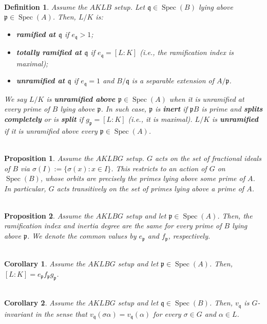 \documentclass[11pt]{article}
\newcommand{\mf}[1]{\mathfrak{#1}}
\DeclareMathOperator{\Spec}{Spec}
\newtheorem*{corollary*}{\\Corollary}
\newtheorem*{definition*}{\\Definition}
\newtheorem*{proposition*}{\\Proposition}
\begin{document}
\begin{definition*}
Assume the $AKLB$ setup. Let $\mf{q}\in\Spec(B)$ lying above $\mf{p}\in\Spec(A)$. Then, $L/K$ is:
\begin{itemize}
\item \textbf{ramified at $\mf{q}$} if $e_{\mf{q}}>1$;
\item \textbf{totally ramified at $\mf{q}$} if $e_{\mf{q}}=[L:K]$ (i.e., the ramification index is maximal);
\item \textbf{unramified at $\mf{q}$} if $e_{\mf{q}}=1$ \emph{and} $B/\mf{q}$ is a separable extension of $A/\mf{p}$.
\end{itemize}
We say $L/K$ is \textbf{unramified above $\mf{p}\in\Spec(A)$} when it is unramified at every prime of $B$ lying above $\mf{p}$. In such case, $\mf{p}$ is \textbf{inert} if $\mf{p}B$ is prime and \textbf{splits completely} or is \textbf{split} if $g_{\mf{p}}=[L:K]$ (i.e., it is maximal). $L/K$ is \textbf{unramified} if it is unramified above every $\mf{p}\in\Spec(A)$.
\end{definition*}

\begin{proposition*}
Assume the $AKLBG$ setup. $G$ acts on the set of fractional ideals of $B$ via $\sigma(I):=\{\sigma(x) : x\in I\}$. This restricts to an action of $G$ on $\Spec(B)$, whose orbits are precisely the primes lying above some prime of $A$. In particular, $G$ acts transitively on the set of primes lying above a prime of $A$.
\end{proposition*}

\begin{proposition*}
Assume the $AKLBG$ setup and let $\mf{p}\in\Spec(A)$. Then, the ramification index and inertia degree are the same for every prime of $B$ lying above $\mf{p}$. We denote the common values by $e_{\mf{p}}$ and $f_{\mf{p}}$, respectively.
\end{proposition*}

\begin{corollary*}
Assume the $AKLBG$ setup and let $\mf{p}\in\Spec(A)$. Then, $[L:K]=e_{\mf{p}}f_{\mf{p}}g_{\mf{p}}$.
\end{corollary*}

\begin{corollary*}
Assume the $AKLBG$ setup and let $\mf{q}\in\Spec(B)$. Then, $v_{\mf{q}}$ is $G$-invariant in the sense that $v_{\mf{q}}(\sigma\alpha)=v_{\mf{q}}(\alpha)$ for every $\sigma\in G$ and $\alpha\in L$.
\end{corollary*}
\end{document}

